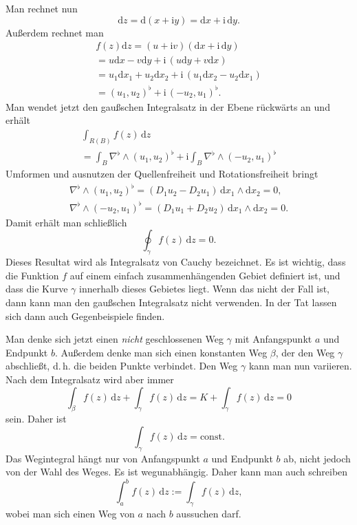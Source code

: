 \documentclass[a4paper,10pt,fleqn,twocolumn,twoside]{article}
\numberwithin{equation}{section}
\newcommand{\ui}{\mathrm i}
\begin{document}
Man rechnet nun
\begin{equation}
\mathrm dz = \mathrm d(x+\ui y) = \mathrm dx+\ui\,\mathrm dy.
\end{equation}
Außerdem rechnet man
\begin{gather*}
f(z)\mathrm dz = (u+\ui v)(\mathrm dx+\ui\,\mathrm dy)\\
= u\mathrm dx-v\mathrm dy+\ui\,(u\mathrm dy+v\mathrm dx)\\
= u_1\mathrm dx_1+u_2\mathrm dx_2+\ui\,(u_1\mathrm dx_2-u_2\mathrm dx_1)\\
= (u_1,u_2)^\flat + \ui\,(-u_2,u_1)^\flat.
\end{gather*}
Man wendet jetzt den gaußschen Integralsatz in der Ebene rückwärts an
und erhält
\begin{gather*}
\int_{R(B)} f(z)\,\mathrm dz\\
= \int_B \nabla^\flat\wedge (u_1,u_2)^\flat
+ \ui\int_B \nabla^\flat\wedge (-u_2,u_1)^\flat
\end{gather*}
Umformen und ausnutzen der Quellenfreiheit
und Rotationsfreiheit bringt
\begin{gather*}
\nabla^\flat\wedge (u_1,u_2)^\flat
= (D_1u_2-D_2u_1)\,\mathrm dx_1\wedge\mathrm dx_2= 0,\\
\nabla^\flat\wedge (-u_2,u_1)^\flat = (D_1u_1+D_2u_2)\,
\mathrm dx_1\wedge\mathrm dx_2 = 0.
\end{gather*}
Damit erhält man schließlich
\begin{equation}
\oint_\gamma f(z)\,\mathrm dz = 0.
\end{equation}
Dieses Resultat wird als Integralsatz von Cauchy bezeichnet.
Es ist wichtig, dass die Funktion $f$ auf einem einfach
zusammenhängenden Gebiet definiert ist, und dass die Kurve $\gamma$
innerhalb dieses Gebietes liegt. Wenn das nicht der Fall ist, dann
kann man den gaußschen Integralsatz nicht verwenden. In der Tat lassen
sich dann auch Gegenbeispiele finden.

Man denke sich jetzt einen \textit{nicht} geschlossenen Weg $\gamma$
mit Anfangspunkt $a$ und Endpunkt $b$. Außerdem denke man sich
einen konstanten Weg $\beta$, der den Weg $\gamma$
abschließt, d.\,h. die beiden Punkte verbindet. Den Weg $\gamma$
kann man nun variieren. Nach dem Integralsatz wird aber immer
\[\int_{\beta} f(z)\,\mathrm dz+\int_\gamma f(z)\,\mathrm dz
=K+\int_\gamma f(z)\,\mathrm dz=0\]
sein. Daher ist
\begin{equation}
\int_\gamma f(z)\,\mathrm dz=\mathrm{const}.
\end{equation}
Das Wegintegral hängt nur von Anfangspunkt $a$ und Endpunkt $b$
ab, nicht jedoch von der Wahl des Weges. Es ist wegunabhängig. Daher
kann man auch schreiben
\begin{equation}
\int_a^b f(z)\,\mathrm dz:=\int_\gamma f(z)\,\mathrm dz,
\end{equation}
wobei man sich einen Weg von $a$ nach $b$ aussuchen darf.
\end{document}
